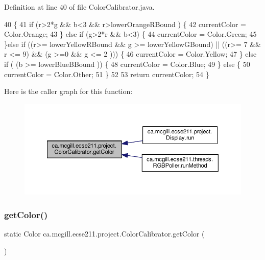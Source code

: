 Definition at line 40 of file Color\+Calibrator.\+java.


\begin{DoxyCode}
40                                                     \{
41     \textcolor{keywordflow}{if} (r>2*g && b<3 && r>lowerOrangeRBound ) \{
42       currentColor = Color.Orange;
43     \} \textcolor{keywordflow}{else} \textcolor{keywordflow}{if} (g>2*r && b<3) \{
44       currentColor = Color.Green;
45       \}\textcolor{keywordflow}{else} \textcolor{keywordflow}{if} ((r>= lowerYellowRBound && g >= lowerYellowGBound) || ((r>= 7 && r <= 9) && (g >=0 && g <= 2
      ))) \{
46       currentColor = Color.Yellow;
47     \} \textcolor{keywordflow}{else} \textcolor{keywordflow}{if} ( (b >= lowerBlueBBound )) \{
48       currentColor = Color.Blue;
49     \} \textcolor{keywordflow}{else} \{
50       currentColor = Color.Other;
51     \}
52 
53     \textcolor{keywordflow}{return} currentColor;
54   \}
\end{DoxyCode}
Here is the caller graph for this function\+:\nopagebreak
\begin{figure}[H]
\begin{center}
\leavevmode
\includegraphics[width=350pt]{classca_1_1mcgill_1_1ecse211_1_1project_1_1_color_calibrator_a92e653a6a9f7a31cb7b6f9bc2e732133_icgraph}
\end{center}
\end{figure}
\mbox{\label{classca_1_1mcgill_1_1ecse211_1_1project_1_1_color_calibrator_a1acf05f9523b2c0f329d4a7cbf1b9c47}} 
\subsubsection{\texorpdfstring{get\+Color()}{getColor()}\hspace{0.1cm}{\footnotesize\ttfamily [2/2]}}
{\footnotesize\ttfamily static Color ca.\+mcgill.\+ecse211.\+project.\+Color\+Calibrator.\+get\+Color (\begin{DoxyParamCaption}{ }\end{DoxyParamCaption})\hspace{0.3cm}{\ttfamily [static]}}

